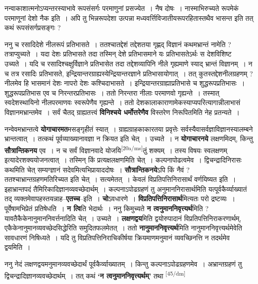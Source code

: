 \documentclass[article,12pt,a4paper]{memoir}
\begin{document}
	  \pstart नन्वाकाशात्मनोऽप्यन्तरस्याभावे रूपसंसर्गः परमाणुनां प्रसज्येत । नैष दोषः । नास्माभिरुच्यते रूपमेकं परमाणूनां देशो नैक इति । अपि तु भिन्नरूपदेशा उत्पन्ना मध्यवर्त्तिविजातीयरूपरहितास्तथैव भासन्त इति तत् कथं रूपसंसर्गप्रसङ्गः ?
	\pend
      

	  \pstart ननु च रसादिदेशे नीलरूपं प्रतिभासते । ततश्चातद्देशं तद्देशतया गृह्णद् विज्ञानं कथमभ्रान्तं नामेति ? तत्राप्युच्यते । यदा देशः प्रतिभासते तदा तस्मिन् देशे प्रतिभासमाने यः प्रतिभासतेऽर्थः स देशविशिष्ट उच्यते । यदि च रसादिश्चक्षुर्विज्ञाने प्रतिभासेत तदा तद्देशव्यापिनि नीले गृह्यमाणे स्याद् भ्रान्तं विज्ञानम् । न च तत्र रसादिः प्रतिभासते, इन्द्रियान्तरग्राह्यस्येन्द्रियान्तरज्ञाने प्रतिभासायोगात् । तत् कुतस्तद्देशनीलग्रहणम् ? नीलमेव हि भासमानं देशः नापरो देशः कश्चिदाभासते । इन्द्रियान्तरग्राह्याप्रतिभासे च शुद्धरूपप्रतिभासः । शुद्धरूपप्रतिभास एव च निरन्तरप्रतिभासः । ततो निरन्तरा नीलाः परमाणवो गृह्यन्ते । तस्मात् स्वदेशस्थायिनो नीलपरमाणवः स्वरूपेणैव गृह्यन्ते । ततो देशकालाकाराणामेकस्याप्यपरित्यागान्नीलाभासं विज्ञानमभ्रान्तमेव । सर्वं चैतद् ग्राह्यतत्त्वं \textbf{विनिश्चये धर्मोत्तरेणैव} विस्तरेण निरूपितमिति नेह प्रतन्यते ।
	\pend
      

	  \pstart नन्वेवमभ्रान्तत्वे \textbf{योगाचारमत}मसङ्गृहीतं स्यात् । ग्राह्यग्राहकाकारतया प्रवृत्तेः सर्वस्यैवासर्वज्ञाविज्ञानस्यालम्बने भ्रान्तत्वात् । तत्कथं पूर्वव्याख्यानावज्ञा न क्रियत इति चेत् । उच्यते । न \textbf{योगाचारनये} लक्षणमिदम्, किन्तु \textbf{सौत्रान्तिकनय} एव । न च सर्वं विज्ञानवादे योजयि\leavevmode\textsuperscript{\rmlatinfont\tiny [20a/ms]}तुं शक्यम् । तस्य विषयः स्वलक्षणम् इत्यादेरशक्ययोजनत्वात् । तस्मिन् किं प्रत्यक्षलक्षणमिति चेत् । कल्पनापोढत्वमेव । द्विचन्द्रादिनिरासः कथमिति चेत् सम्यग्ज्ञानं सदेवमित्यभिप्रायाददोषः । \textbf{सौत्रान्तिकनये}ऽपि किं नैवं ? ततश्चाभ्रान्तग्रहणमतिरिच्यत इति चेत् । सत्यमेतत् । केवलं विप्रतिपत्तिनिरासार्थं वर्णयिष्यत इति । इहाभ्रान्तपदं तैमिरिकादिज्ञानव्यवच्छेदार्थम् । कल्पनाऽपोढग्रहणं तु अनुमाननिरासार्थमिति यत्पूर्वकैर्व्याख्यातं तद् व्यक्तमेवापहस्तयन्नाह--\textbf{एतच्च}--इति । \textbf{चो}ऽवधारणे । \textbf{विप्रतिपत्तिनिरासार्थ}मित्यतः परो द्रष्टव्यः । पूर्वेषामभिप्रेतं प्रतिषेधति । \textbf{न त्वि}ति भेदार्थः । ननु किमुच्यते \textbf{न त्वनुमाननिवृत्त्यर्थ}मिति ? यावतैकैकेनानुमाननिवर्त्तनादिति चेत् । उच्यते । \textbf{लक्षणद्वय}मिति द्वयोरुपादानं विप्रतिपत्तिनिराकरणार्थम्, एकैकेनानुमानव्यवच्छेदसिद्धेरिति समुदितफलमेतत् । ततो \textbf{नानुमाननिवृत्त्यर्थ}मिति नानुमाननिवृत्त्यर्थमेवेति सावधारणं निषिध्यते । यदि तु विप्रतिपत्तिनिराचिकीर्षया क्रियमाणमनुमानं व्यवच्छिनत्ति न तदर्थमेव द्वयमिति ।
	\pend
      

	  \pstart ननु नेदं लक्षणद्वयमनुमानव्यवच्छेदार्थं पूर्वकैर्व्याख्यातम् । किन्तु कल्पनाऽपोढग्रहणमेव । अभ्रान्तग्रहणं तु द्विचन्द्रादिज्ञानव्यवच्छेदार्थम् । तत् कथं \textbf{‘न त्वनुमाननिवृत्त्यर्थम्’} तथा  \leavevmode\textsuperscript{\rmlatinfont\tiny [45/dm]} 
	  
\end{document}
